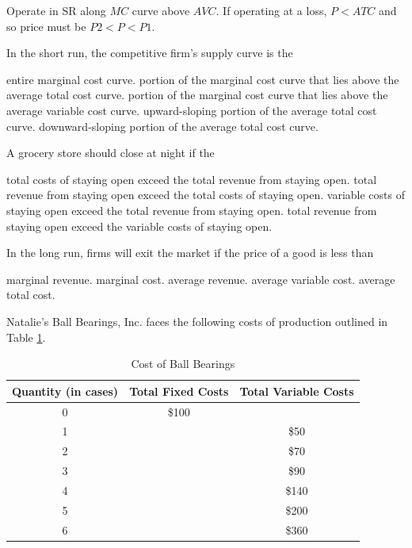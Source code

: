 \documentclass[addpoints,11pt]{exam}
\theoremstyle{definition}
\begin{document}
\begin{questions}
			\begin{solution}
				Operate in SR along $MC$ curve above $AVC$. If operating at a loss, $P<ATC$ and so price must be $P2 < P < P1$.
			\end{solution}
				
\question In the short run, the competitive firm's supply curve is the 

\begin{choices}
	\choice entire marginal cost curve.
	\choice portion of the marginal cost curve that lies above the average total cost curve.
	\CorrectChoice portion of the marginal cost curve that lies above the average variable cost curve.
	\choice upward-sloping portion of the average total cost curve.
	\choice downward-sloping portion of the average total cost curve.
\end{choices}

\question A grocery store should close at night if the

\begin{choices}
	\choice total costs of staying open exceed the total revenue from staying open.
	\choice total revenue from staying open exceed the total costs of staying open.
	\CorrectChoice variable costs of staying open exceed the total revenue from staying open.
	\choice total revenue from staying open exceed the variable costs of staying open.
\end{choices}

\newpage

\question In the long run, firms will exit the market if the price of a good is less than 

\begin{choices}
	\choice marginal revenue.
	\choice marginal cost.
	\choice average revenue.
	\choice average variable cost.
	\CorrectChoice average total cost.
\end{choices}
	
	\question Natalie's Ball Bearings, Inc. faces the following costs of production outlined in Table \ref{tab4}.
	
	\begin{table}[h]
		\centering
		\caption{Cost of Ball Bearings}
		\label{tab4}
		\begin{tabular}{  c|c|c}        
			
			Quantity (in cases) & Total Fixed Costs & Total Variable Costs \\
			\hline
			0 & \$100  &  \\
			1 &  & \$50 \\
			2 &  & \$70 \\
			3 &  & \$90  \\
			4 &  & \$140 \\
			5 &  & \$200 \\
			6 &  & \$360  \\
		\end{tabular}
	\end{table} 
	

\end{questions}
\end{document}
